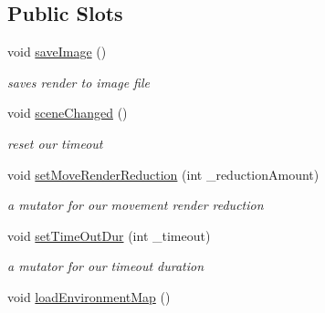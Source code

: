 \subsection*{Public Slots}
\begin{DoxyCompactItemize}
\item 
\hypertarget{class_open_g_l_widget_add5f020c30887952a27d05bce9c30a65}{void \hyperlink{class_open_g_l_widget_add5f020c30887952a27d05bce9c30a65}{save\-Image} ()}\label{class_open_g_l_widget_add5f020c30887952a27d05bce9c30a65}

\begin{DoxyCompactList}\small\item\em saves render to image file \end{DoxyCompactList}\item 
\hypertarget{class_open_g_l_widget_a1c999d41b2fd1235075366d5f3ae8f8c}{void \hyperlink{class_open_g_l_widget_a1c999d41b2fd1235075366d5f3ae8f8c}{scene\-Changed} ()}\label{class_open_g_l_widget_a1c999d41b2fd1235075366d5f3ae8f8c}

\begin{DoxyCompactList}\small\item\em reset our timeout \end{DoxyCompactList}\item 
\hypertarget{class_open_g_l_widget_aba8b77d95faa4faed8cbbbb50ca12730}{void \hyperlink{class_open_g_l_widget_aba8b77d95faa4faed8cbbbb50ca12730}{set\-Move\-Render\-Reduction} (int \-\_\-reduction\-Amount)}\label{class_open_g_l_widget_aba8b77d95faa4faed8cbbbb50ca12730}

\begin{DoxyCompactList}\small\item\em a mutator for our movement render reduction \end{DoxyCompactList}\item 
\hypertarget{class_open_g_l_widget_aa8da4d85e7494c97289726ed1526ea13}{void \hyperlink{class_open_g_l_widget_aa8da4d85e7494c97289726ed1526ea13}{set\-Time\-Out\-Dur} (int \-\_\-timeout)}\label{class_open_g_l_widget_aa8da4d85e7494c97289726ed1526ea13}

\begin{DoxyCompactList}\small\item\em a mutator for our timeout duration \end{DoxyCompactList}\item 
\hypertarget{class_open_g_l_widget_a3dcd8afdaba77d2e15dd73d34186a734}{void \hyperlink{class_open_g_l_widget_a3dcd8afdaba77d2e15dd73d34186a734}{load\-Environment\-Map} ()}\label{class_open_g_l_widget_a3dcd8afdaba77d2e15dd73d34186a734}


\end{DoxyCompactItemize}
